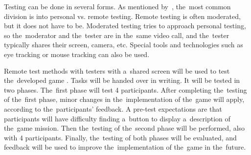 Testing can be done in several forms.
As mentioned by~\cite{moran_2019_usability}, the~most common division is into personal vs. remote testing.
Remote testing is often moderated, but it does not have to be.
Moderated testing tries to approach personal testing, so the~moderator and the~tester are in the~same video call, and the~tester typically shares their screen, camera, etc.
Special tools and technologies such as eye tracking or mouse tracking can also be used.

Remote test methods with testers with a~shared screen will be used to test the~developed game \myAppName{}.
Tasks will be handed over in writing.
It will be tested in two phases.
The~first phase will test 4 participants.
After completing the~testing of the~first phase, minor changes in the~implementation of the~game will apply, according to the~participants' feedback.
A pre-test expectations are that participants will have difficulty finding a~button to display a~description of the~game mission.
Then the~testing of the~second phase will be performed, also with 4 participants.
Finally, the~testing of both phases will be evaluated, and feedback will be used to improve the~implementation of the~game in the~future.
